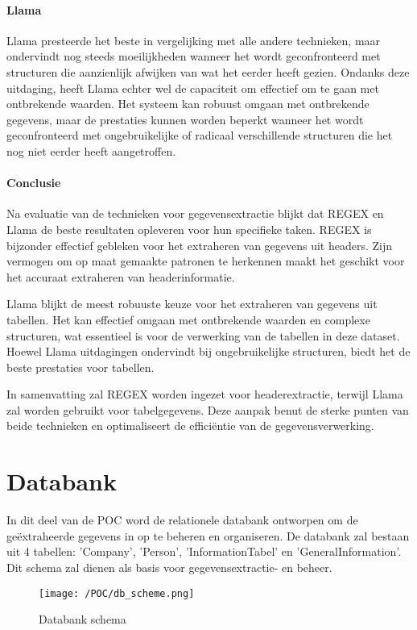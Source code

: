 \paragraph{Llama}
Llama presteerde het beste in vergelijking met alle andere technieken, maar ondervindt nog steeds moeilijkheden wanneer het wordt geconfronteerd met structuren die aanzienlijk afwijken van wat het eerder heeft gezien. Ondanks deze uitdaging, heeft Llama echter wel de capaciteit om effectief om te gaan met ontbrekende waarden. Het systeem kan robuust omgaan met ontbrekende gegevens, maar de prestaties kunnen worden beperkt wanneer het wordt geconfronteerd met ongebruikelijke of radicaal verschillende structuren die het nog niet eerder heeft aangetroffen.

\paragraph{Conclusie}


Na evaluatie van de technieken voor gegevensextractie blijkt dat REGEX en Llama de beste resultaten opleveren voor hun specifieke taken. REGEX is bijzonder effectief gebleken voor het extraheren van gegevens uit headers. Zijn vermogen om op maat gemaakte patronen te herkennen maakt het geschikt voor het accuraat extraheren van headerinformatie. 

Llama blijkt de meest robuuste keuze voor het extraheren van gegevens uit tabellen. Het kan effectief omgaan met ontbrekende waarden en complexe structuren, wat essentieel is voor de verwerking van de tabellen in deze dataset. Hoewel Llama uitdagingen ondervindt bij ongebruikelijke structuren, biedt het de beste prestaties voor tabellen.

In samenvatting zal REGEX worden ingezet voor headerextractie, terwijl Llama zal worden gebruikt voor tabelgegevens. Deze aanpak benut de sterke punten van beide technieken en optimaliseert de efficiëntie van de gegevensverwerking.

\section{Databank}
In dit deel van de POC word de relationele databank ontworpen om de geëxtraheerde gegevens in op te beheren en organiseren. De databank zal bestaan uit 4 tabellen: 'Company', 'Person', 'InformationTabel' en 'GeneralInformation'. Dit schema zal dienen als basis voor gegevensextractie- en beheer.

\begin{figure}[H]
    \centering        
    \texttt{[image: /POC/db\_scheme.png]}
    \caption{Databank schema}
    \label{fig:databank_schema}
\end{figure}
